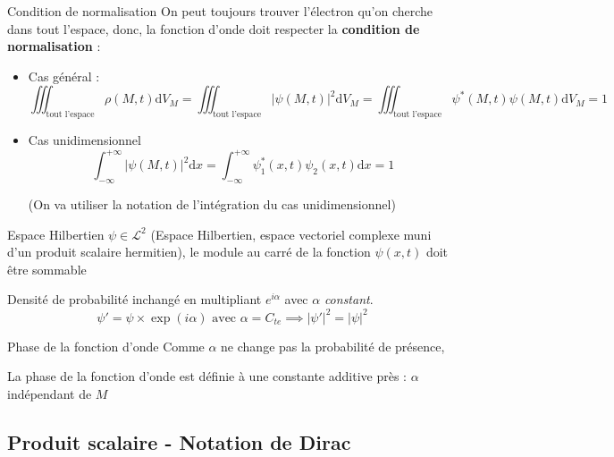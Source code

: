 \begin{Definition}[colbacktitle=red!75!black]{Condition de normalisation}{}
On peut toujours trouver l'électron qu'on cherche dans tout l'espace, donc, la fonction d'onde doit respecter la \textbf{condition de normalisation} : 

  \begin{itemize}
\item Cas général : \[
          \boxed{\iiint_{\text{tout l'espace}} \rho(M,t)\mathrm{d} V_M = \iiint_{\text{tout l'espace}} |\psi(M,t)|^{2}\mathrm{d} V_M = \iiint_{\text{tout l'espace}} \psi ^* (M,t) \psi(M,t)\mathrm{d} V_M = 1}
        \]
    \item Cas unidimensionnel
        \[
        \int_{-\infty}^{+\infty} |\psi(M,t)|^{2}\mathrm{d} x = \displaystyle\int_{- \infty}^{ + \infty} \psi_1 ^{*}(x,t) \psi_2(x,t) \mathrm{d}x = 1
        \]

    (On va utiliser la notation de l'intégration du cas unidimensionnel)
  \end{itemize}
\end{Definition}


\begin{Prop}{Espace Hilbertien}{}
$\psi \in \mathcal{L}^{2}$ (Espace Hilbertien, espace vectoriel complexe muni d'un produit scalaire hermitien), le module au carré de la fonction $\psi(x,t)$ doit être sommable
\end{Prop}

\begin{Prop}{}{}
    Densité de probabilité inchangé en multipliant $e^{i\alpha}$ avec $\alpha$  \textit{constant}.
        \[
          \boxed{\psi' = \psi \times \exp(i \alpha) \text{ avec } \alpha = C _{te} \implies |\psi'|^{2} = |\psi|^{2}}
        \]
\end{Prop}


\begin{Definition}[colbacktitle=red!75!black]{Phase de la fonction d'onde}{}
Comme $\alpha$ ne change pas la probabilité de présence, 
\begin{center}
    La phase de la fonction d'onde est définie à une constante additive près : $\alpha$ indépendant de $M$
\end{center}
\end{Definition}


\subsection{Produit scalaire - Notation de Dirac} %

